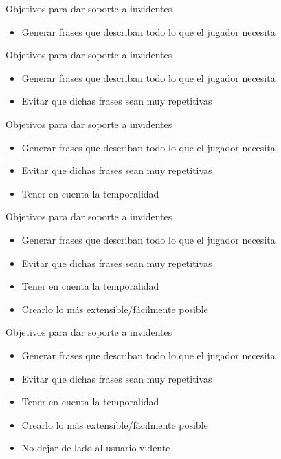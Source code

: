 
\begin{tframe}{Objetivos para dar soporte a invidentes}
	\begin{itemize}
		\item<+-| alert@+> Generar frases que describan todo lo que el jugador necesita		
	\end{itemize}
\end{tframe}

\begin{tframe}{Objetivos para dar soporte a invidentes}
	\begin{itemize}
		\item Generar frases que describan todo lo que el jugador necesita
		\item<+-| alert@+> Evitar que dichas frases sean muy repetitivas
	\end{itemize}
\end{tframe}

\begin{tframe}{Objetivos para dar soporte a invidentes}
	\begin{itemize}
		\item Generar frases que describan todo lo que el jugador necesita
		\item Evitar que dichas frases sean muy repetitivas
		\item<+-| alert@+> Tener en cuenta la temporalidad
	\end{itemize}
\end{tframe}

\begin{tframe}{Objetivos para dar soporte a invidentes}
	\begin{itemize}
		\item Generar frases que describan todo lo que el jugador necesita
		\item Evitar que dichas frases sean muy repetitivas
		\item Tener en cuenta la temporalidad
		\item<+-| alert@+> Crearlo lo más extensible/fácilmente posible
	\end{itemize}
\end{tframe}

\begin{tframe}{Objetivos para dar soporte a invidentes}
	\begin{itemize}
		\item Generar frases que describan todo lo que el jugador necesita
		\item Evitar que dichas frases sean muy repetitivas
		\item Tener en cuenta la temporalidad
		\item Crearlo lo más extensible/fácilmente posible
		\item<+-| alert@+> No dejar de lado al usuario vidente
	\end{itemize}
\end{tframe}

